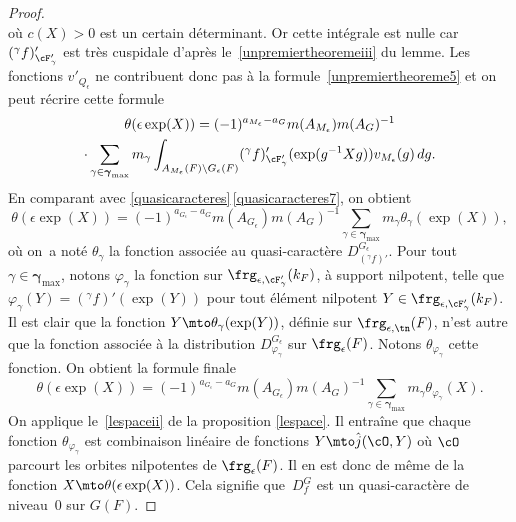 \begin{proof}
\[\]
où $c(X)>0$ est un certain déterminant. Or cette intégrale est nulle car $(^{\gamma}f)'_{\cF'_{\gamma}}$ est très cuspidale d'après le~\eqref{unpremiertheoremeiii} du lemme. Les fonctions $v'_{Q_{\epsilon}}$ ne contribuent donc pas à la formule~\eqref{unpremiertheoreme5} et on peut récrire cette formule
\begin{multline*}
\theta(\epsilon \exp(X))=(-1)^{a_{M_{\epsilon}}-a_{G}}m(A_{M_{\epsilon}})m(A_{G})^{-1}\\
\cdot\sum_{\gamma\in \boldsymbol{\gamma}_{\max}}m_{\gamma}
\int_{A_{M_{\epsilon}}(F)\backslash G_{\epsilon}(F)}(^{\gamma}f)'_{\cF'_{\gamma}}(\exp(g^{-1}X g))v_{M_{\epsilon}} (g)\,dg.
\end{multline*}
En comparant avec \ref{quasicaracteres}\,\eqref{quasicaracteres7}, on obtient
\[
\theta(\epsilon \exp(X))=(-1)^{a_{G_{\epsilon}}-a_{G}}m(A_{G_{\epsilon}})m(A_{G})^{-1}\sum_{\gamma\in \boldsymbol{\gamma}_{\max}}m_{\gamma}\theta_{\gamma}(\exp(X)),
\]
où on~a noté $\theta_{\gamma}$ la fonction associée au quasi-caractère $D^{G_{\epsilon}}_{(^{\gamma}f)'}$. Pour tout $\gamma\in \boldsymbol{\gamma}_{\max}$, notons $\varphi_{\gamma}$ la fonction sur $\boldsymbol{\frg}_{\epsilon,\cF'_{\gamma}}(k_{F})$, à support nilpotent, telle que $\varphi_{\gamma}(Y)=(^{\gamma}f)'(\exp(Y))$ pour tout élément nilpotent $Y\in \boldsymbol{\frg}_{\epsilon,\cF'_{\gamma}}(k_{F})$. Il est clair que la fonction $Y\mto \theta_{\gamma}(\exp(Y))$, définie sur $\frg_{\epsilon,\tn}(F)$, n'est autre que la fonction associée à la distribution $D^{G_{\epsilon}}_{\varphi_{\gamma}}$ sur $\frg_{\epsilon}(F)$. Notons $\theta_{\varphi_{\gamma}}$ cette fonction. On obtient la formule finale
\begin{equation}\tag{6}\label{unpremiertheoreme6}
\theta(\epsilon \exp(X))=(-1)^{a_{G_{\epsilon}}-a_{G}}m(A_{G_{\epsilon}})m(A_{G})^{-1}\sum_{\gamma\in \boldsymbol{\gamma}_{\max}}m_{\gamma}\theta_{\varphi_{\gamma}}(X).
\end{equation}
On applique le~\eqref{lespaceii} de la proposition \ref{lespace}. Il entraîne que chaque fonction $\theta_{\varphi_{\gamma}}$ est combinaison linéaire de fonctions $Y\mto \hat{j}(\cO,Y)$ où $\cO$ parcourt les orbites nilpotentes de $\frg_{\epsilon}(F)$. Il en est donc de même
de la fonction $X\mto \theta(\epsilon \exp(X))$. Cela signifie que~$D^G_{f}$ est un quasi-caractère de niveau~$0$ sur $G(F)$.
\end{proof}

\label{restriction}

